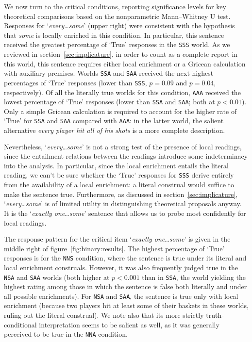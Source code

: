 \documentclass[leqno,12pt]{article}
\newcommand{\secref}[1]{section~\ref{#1}}
\newcommand{\figref}[1]{figure~\ref{#1}}
\newcommand{\word}[1]{\emph{#1}}
\newcommand{\world}[1]{\texttt{#1}}
\newcommand{\target}[2]{`\word{#1}\ldots\word{#2}'}
\begin{document}
{We now turn to the critical conditions, reporting significance levels
for key theoretical comparisons based on the nonparametric
Mann--Whitney U test. Responses for \target{every}{some} (upper right)
were consistent with the hypothesis that \word{some} is locally
enriched in this condition. In particular, this sentence received the
greatest percentage of `True' responses in the \world{SSS} world. As
we reviewed in \secref{sec:implicature}, in order to count as a
complete report in this world, this sentence requires either local
enrichment or a Gricean calculation with auxiliary premises. Worlds
\world{SSA} and \world{SAA} received the next highest percentages of
`True' responses (lower than \world{SSS}, $p = 0.09$ and $p = 0.04$,
respectively). Of all the literally true worlds for this condition,
\world{AAA} received the lowest percentage of `True' responses (lower
than \world{SSA} and \world{SAA}; both at $p < 0.01$).  Only a simple
Gricean calculation is required to account for the higher rate of
`True' for \world{SSA} and \world{SAA} compared with \world{AAA}: in
the latter world, the salient alternative \word{every player hit all
  of his shots} is a more complete description.

Nevertheless, \target{every}{some} is not a strong test of the
presence of local readings, since the entailment relations between the
readings introduce some indeterminacy into the analysis. In
particular, since the local enrichment entails the literal reading, we
can't be sure whether the `True' responses for \world{SSS} derive
entirely from the availability of a local enrichment: a literal
construal would suffice to make the sentence true. Furthermore, as
discussed in \secref{sec:implicature}, \target{every}{some} is of
limited utility in distinguishing theoretical proposals anyway. It is
the \target{exactly one}{some} sentence that allows us to probe most
confidently for local readings.

The response pattern for the critical item \target{exactly one}{some}
is given in the middle right of \figref{fig:binary:results}. The
highest percentage of `True' responses is for the \world{NNS}
condition, where the sentence is true under its literal and local
enrichment construals. However, it was also frequently judged true in
the \world{NSA} and \world{SAA} worlds (both higher at $p < 0.001$
than in \world{SSA}, the world yielding the highest rating among those
in which the sentence is false both literally and under all possible
enrichments). For \world{NSA} and \world{SAA}, the sentence is true
only with local enrichment (because two players hit at least some of
their baskets in these worlds, ruling out the literal construal).  We
note also that its more strictly truth-conditional interpretation
seems to be salient as well, as it was generally perceived to be true
in the \world{NNA} condition.

}
\end{document}

